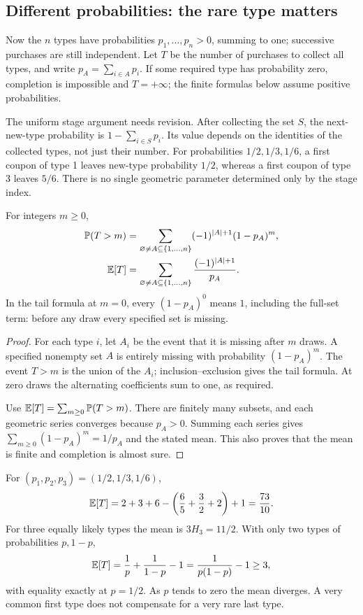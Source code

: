 \subsection{Different probabilities: the rare type matters}
\label{sec:unequal-coupon-collector}

Now the $n$ types have probabilities $p_1,\ldots,p_n>0$, summing to
one; successive purchases are still independent. Let $T$ be the number
of purchases to collect all types, and write $p_A=\sum_{i\in A}p_i$.
If some required type has probability zero, completion is impossible
and $T=+\infty$; the finite formulas below assume positive probabilities.

The uniform stage argument needs revision. After collecting the set $S$,
the next-new-type probability is $1-\sum_{i\in S}p_i$. Its value depends
on the identities of the collected types, not just their number. For
probabilities $1/2,1/3,1/6$, a first coupon of type 1 leaves new-type
probability $1/2$, whereas a first coupon of type 3 leaves $5/6$.
There is no single geometric parameter determined only by the stage index.

\begin{proposition}
\label{prop:unequal-coupon-formulas}
For integers $m\ge0$,
\begin{align*}
\mathbb P(T>m)&=\sum_{\varnothing\ne A\subseteq\{1,\ldots,n\}}
(-1)^{|A|+1}(1-p_A)^m,\\
\mathbb E[T]&=\sum_{\varnothing\ne A\subseteq\{1,\ldots,n\}}
\frac{(-1)^{|A|+1}}{p_A}.
\end{align*}
In the tail formula at $m=0$, every $(1-p_A)^0$ means $1$, including
the full-set term: before any draw every specified set is missing.
\end{proposition}
\begin{proof}
For each type $i$, let $A_i$ be the event that it is missing after $m$
draws. A specified nonempty set $A$ is entirely missing with probability
$(1-p_A)^m$. The event $T>m$ is the union of the $A_i$;
inclusion--exclusion gives the tail formula. At zero draws the alternating
coefficients sum to one, as required.

Use $\mathbb E[T]=\sum_{m\ge0}\mathbb P(T>m)$. There are finitely many subsets,
and each geometric series converges because $p_A>0$. Summing each
series gives $\sum_{m\ge0}(1-p_A)^m=1/p_A$ and the stated mean.
This also proves that the mean is finite and completion is almost sure.
\end{proof}

\begin{example}
For $(p_1,p_2,p_3)=(1/2,1/3,1/6)$,
\[
\mathbb E[T]=2+3+6-\left(\frac65+\frac32+2\right)+1
=\frac{73}{10}.
\]
For three equally likely types the mean is $3H_3=11/2$.
With only two types of probabilities $p,1-p$,
\[
\mathbb E[T]=\frac1p+\frac1{1-p}-1=\frac1{p(1-p)}-1\ge3,
\]
with equality exactly at $p=1/2$. As $p$ tends to zero the mean
diverges. A very common first type does not compensate for a very rare
last type.
\end{example}


